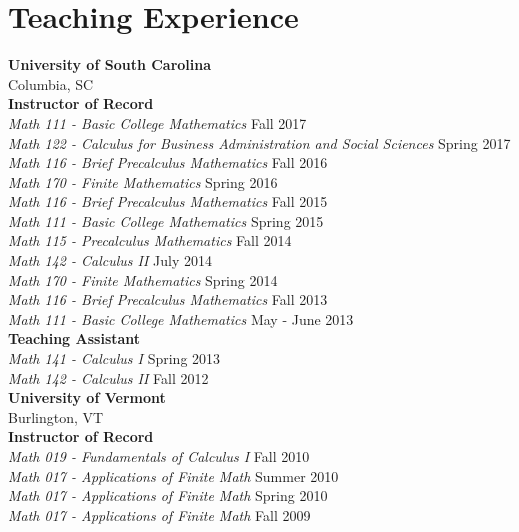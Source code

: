 \documentclass{article}
\begin{document}
  \section*{Teaching Experience}
  \textbf{University of South Carolina}\\Columbia, SC\\
  
  \noindent\textbf{Instructor of Record}\\
  \textsl{Math 111 - Basic College Mathematics} \hfill Fall 2017\\
  \textsl{Math 122 - Calculus for Business Administration and Social Sciences} \hfill Spring 2017\\
  \textsl{Math 116 - Brief Precalculus Mathematics} \hfill Fall 2016\\
  \textsl{Math 170 - Finite Mathematics} \hfill Spring 2016\\
  \textsl{Math 116 - Brief Precalculus Mathematics} \hfill Fall 2015\\
  \textsl{Math 111 - Basic College Mathematics} \hfill Spring 2015\\
  \textsl{Math 115 - Precalculus Mathematics} \hfill Fall 2014\\
  \textsl{Math 142 - Calculus II} \hfill July 2014\\
  \textsl{Math 170 - Finite Mathematics} \hfill Spring 2014\\
  \textsl{Math 116 - Brief Precalculus Mathematics} \hfill Fall 2013\\
  \textsl{Math 111 - Basic College Mathematics} \hfill May - June 2013\\

  \noindent\textbf{Teaching Assistant}\\
  \textsl{Math 141 - Calculus I} \hfill Spring 2013\\
  \textsl{Math 142 - Calculus II} \hfill Fall 2012\\

  \noindent\textbf{University of Vermont}\\Burlington, VT\\
  
  \noindent\textbf{Instructor of Record}\\
  \textsl{Math 019 - Fundamentals of Calculus I} \hfill Fall 2010\\
  \textsl{Math 017 - Applications of Finite Math} \hfill Summer 2010\\
  \textsl{Math 017 - Applications of Finite Math} \hfill Spring 2010\\
  \textsl{Math 017 - Applications of Finite Math} \hfill Fall 2009\\
  
\end{document}
